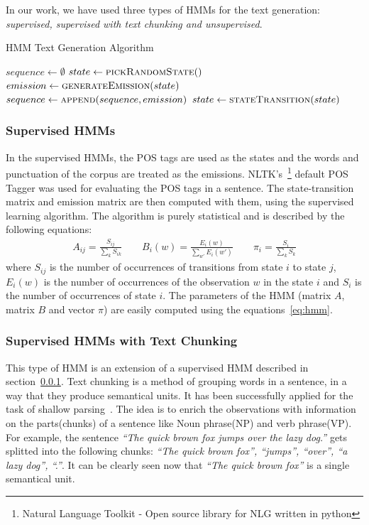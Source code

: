\documentclass[a4paper,12pt]{article}
\begin{document}
In our work, we have used three types of HMMs for the text generation:
\textit{supervised, supervised with text chunking and unsupervised}.

\begin{algorithm}
\caption{HMM Text Generation Algorithm}
\label{alg:hmm}
\begin{algorithmic}[1]
	\State $sequence \gets \emptyset$
	\State $state \gets \Call{pickRandomState}$
	\Repeat
		\State $emission \gets \Call{generateEmission}{state}$
		\State $sequence \gets \Call{append}{sequence, emission}$
		\State $state \gets \Call{stateTransition}{state}$
	 \\
\end{algorithmic}
\end{algorithm}

\subsubsection{Supervised HMMs}
\label{sec:suphmm}
In the supervised HMMs, the POS tags are used as the states and the words and
punctuation of the corpus are treated as the emissions. NLTK's~\footnote{Natural
Language Toolkit - Open source library for NLG written in python} default POS Tagger was
used for evaluating the POS tags in a sentence. The state-transition matrix and
emission matrix are then computed with them, using the supervised learning
algorithm. The algorithm is purely statistical and is described by the
following equations:
\begin{align}
\label{eq:hmm}
A_{ij} = \frac{S_{ij}}{\sum_{k} S_{ik}} \qquad
B_{i}(w) = \frac{E_{i}(w)}{\sum_{w'} E_{i}(w')} \qquad
\pi_{i} = \frac{S_{i}}{\sum_{k} S_{k}}
\end{align}
where $S_{ij}$ is the number of occurrences of transitions from state $i$ to
state $j$, $E_{i}(w)$ is the number of occurrences of the observation $w$ in the
state $i$ and $S_{i}$ is the number of occurrences of state $i$. The
parameters of the HMM (matrix $A$, matrix $B$ and vector $\pi$) are easily
computed using the equations~\ref{eq:hmm}.

\subsubsection{Supervised HMMs with Text Chunking}
This type of HMM is an extension of a supervised HMM described in
section~\ref{sec:suphmm}. Text chunking is a method of grouping words in a
sentence, in a way that they produce semantical units. It has been successfully 
applied for the task of shallow parsing~\cite{hmmchunk}. The idea is to enrich the
observations with information on the parts(chunks) of a sentence like Noun phrase(NP)
and verb phrase(VP). For example, the sentence
\textit{``The quick brown fox jumps over the lazy dog.''} gets splitted into the
following chunks: \textit{``The quick brown fox'', ``jumps'', ``over'', ``a lazy
dog'', ``.''}. It can be clearly seen now that \textit{``The quick brown fox''}
is a single semantical unit.
\end{document}

